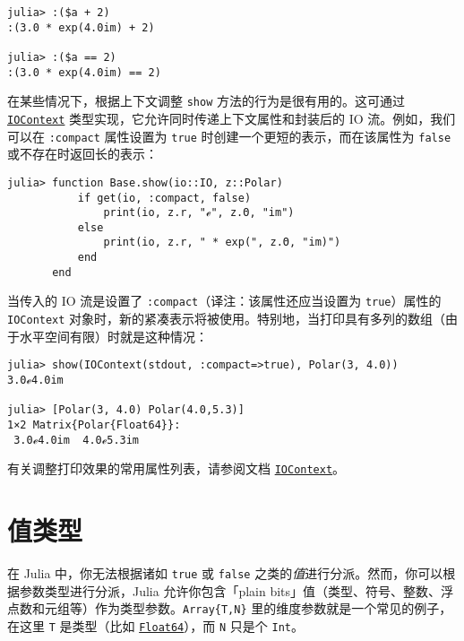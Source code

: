 \begin{verbatim}
julia> :($a + 2)
:(3.0 * exp(4.0im) + 2)

julia> :($a == 2)
:(3.0 * exp(4.0im) == 2)
\end{verbatim}



在某些情况下，根据上下文调整 \texttt{show} 方法的行为是很有用的。这可通过 \hyperlink{13454403377667762339}{\texttt{IOContext}} 类型实现，它允许同时传递上下文属性和封装后的 IO 流。例如，我们可以在 \texttt{:compact} 属性设置为 \texttt{true} 时创建一个更短的表示，而在该属性为 \texttt{false} 或不存在时返回长的表示：




\begin{verbatim}
julia> function Base.show(io::IO, z::Polar)
           if get(io, :compact, false)
               print(io, z.r, "ℯ", z.Θ, "im")
           else
               print(io, z.r, " * exp(", z.Θ, "im)")
           end
       end
\end{verbatim}



当传入的 IO 流是设置了 \texttt{:compact}（译注：该属性还应当设置为 \texttt{true}）属性的 \texttt{IOContext} 对象时，新的紧凑表示将被使用。特别地，当打印具有多列的数组（由于水平空间有限）时就是这种情况：




\begin{verbatim}
julia> show(IOContext(stdout, :compact=>true), Polar(3, 4.0))
3.0ℯ4.0im

julia> [Polar(3, 4.0) Polar(4.0,5.3)]
1×2 Matrix{Polar{Float64}}:
 3.0ℯ4.0im  4.0ℯ5.3im
\end{verbatim}



有关调整打印效果的常用属性列表，请参阅文档 \hyperlink{13454403377667762339}{\texttt{IOContext}}。



\hypertarget{764608991862279222}{}


\section{值类型}



在 Julia 中，你无法根据诸如 \texttt{true} 或 \texttt{false} 之类的\emph{值}进行分派。然而，你可以根据参数类型进行分派，Julia 允许你包含「plain bits」值（类型、符号、整数、浮点数和元组等）作为类型参数。\texttt{Array\{T,N\}} 里的维度参数就是一个常见的例子，在这里 \texttt{T} 是类型（比如 \hyperlink{5027751419500983000}{\texttt{Float64}}），而 \texttt{N} 只是个 \texttt{Int}。




